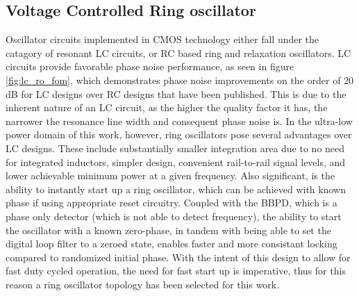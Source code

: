 


\FloatBarrier\pagebreak
\subsection{Voltage Controlled Ring oscillator}
	Oscillator circuits implemented in CMOS technology either fall under the catagory of resonant LC circuits, or RC based ring and relaxation oscillators. LC circuits provide favorable phase noise performance, as seen in figure \ref{fig:lc_ro_fom}, which demonstrates phase noise improvements on the order of 20 dB for LC designs over RC designs that have been published. This is due to the inherent nature of an LC circuit, as the higher the quality factor it has, the narrower the resonance line width and consequent phase noise is. In the ultra-low power domain of this work, however, ring oscillators pose several advantages over LC designs. These include substantially smaller integration area due to no need for integrated inductors, simpler design, convenient rail-to-rail signal levels, and lower achievable minimum power at a given frequency. Also significant, is the ability to instantly start up a ring oscillator, which can be achieved with known phase if using appropriate reset circuitry. Coupled with the BBPD, which is a phase only detector (which is not able to detect frequency), the ability to start the oscillator with a known zero-phase, in tandem with being able to set the digital loop filter to a zeroed state, enables faster and more consistant locking compared to randomized initial phase. With the intent of this design to allow for fast duty cycled operation, the need for fast start up is imperative, thus for this reason a ring oscillator topology has been selected for this work. 

